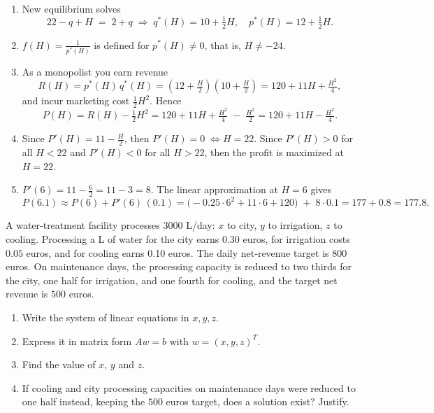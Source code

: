 \documentclass[11pt]{exam}
\begin{document}
\begin{questions}
\begin{solution}
\begin{enumerate}[label=(\alph*)]
  \item New equilibrium solves 
    \[
      22 - q + H \;=\; 2 + q
      \;\Longrightarrow\;
      q^*(H)=10+\tfrac12H,
      \quad
      p^*(H)=12+\tfrac12H.
    \]
  \item $f(H)=\frac1{p^*(H)}$ is defined for $p^*(H)\neq0$, that is, $H\neq-24.$
  \item As a monopolist you earn revenue 
  \[
    R(H)=p^*(H)\,q^*(H)
           =(12+\tfrac H2)(10+\tfrac H2)
           =120 + 11H + \tfrac{H^2}4,
  \]
  and incur marketing cost \(\tfrac12H^2\).  Hence
  \[
    P(H)=R(H)-\tfrac12H^2
         =120 + 11H + \tfrac{H^2}4 \;-\;\tfrac{H^2}2
         =120 + 11H - \tfrac{H^2}4.
  \]
  \item Since $P'(H)=11 - \tfrac{H}{2}$, then $P'(H)=0\;\Longleftrightarrow H=22$. Since $P'(H) > 0$ for all $H < 22$ and $P'(H) < 0$ for all $H > 22$, then the profit is maximized at $H = 22$.
  \item $P'(6)=11 - \tfrac{6}{2}=11-3=8$. The linear approximation at \(H=6\) gives 
  $$
  P(6.1)\approx P(6) + P'(6)\,(0.1)
             =\bigl(-0.25\cdot6^2+11\cdot6+120\bigr)
              \;+\;8\cdot0.1
             =177 + 0.8
             =177.8.
  $$
\end{enumerate}
\end{solution}

\question[2]
A water‐treatment facility processes $3000$ L/day: $x$ to city, $y$ to irrigation, $z$ to cooling. Processing a L of water for the city earns $0.30$ euros, for irrigation costs $0.05$ euros, and for cooling earns 0.10 euros. The daily net‐revenue target is $800$ euros. On maintenance days, the processing capacity is reduced to two thirds for the city, one half for irrigation, and one fourth for cooling, and the target net revenue is $500$ euros.
\begin{enumerate}[label=(\alph*)]
  \item Write the system of linear equations in $x,y,z$.
  \item Express it in matrix form $Aw=b$ with $w=(x,y,z)^T$.
  \item Find the value of $x$, $y$ and $z$.
  \item If cooling and city processing capacities on maintenance days were reduced to one half instead, keeping the $500$ euros target, does a solution exist? Justify.
\end{enumerate}


\end{questions}
\end{document}
